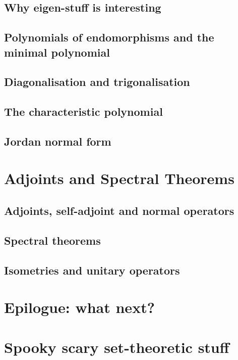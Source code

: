 \documentclass{book}
\theoremstyle{plain}
\theoremstyle{definition}
\theoremstyle{remark}
\begin{document}
\section{Why eigen-stuff is interesting}

\section{Polynomials of endomorphisms and the minimal polynomial}

\section{Diagonalisation and trigonalisation}

\section{The characteristic polynomial}

\section{Jordan normal form}

\chapter{Adjoints and Spectral Theorems}

\section{Adjoints, self-adjoint and normal operators}

\section{Spectral theorems}

\section{Isometries and unitary operators}

\chapter*{Epilogue: what next?}

\appendix

\chapter{Spooky scary set-theoretic stuff}
\end{document}
